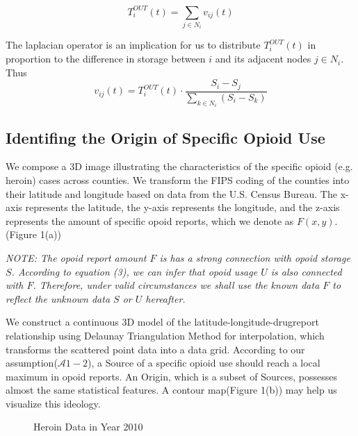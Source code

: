 \begin{equation}
T^{OUT}_i(t) = \sum_{j\in N_i}v_{ij}(t)
\end{equation}

The laplacian operator is an implication for us to distribute $T^{OUT}_i(t)$ in proportion to the difference in storage between $i$ and its adjacent nodes $j \in N_i$. Thus
\begin{equation}
v_{ij}(t) = T^{OUT}_i(t)\cdot \frac{S_i - S_j}{\sum_{k \in N_i}(S_i - S_k)}
\end{equation}



\subsection{Identifing the Origin of Specific Opioid Use}
We compose a 3D image illustrating the characteristics of the specific opioid (e.g. heroin) cases across counties. We transform the FIPS coding of the counties into their latitude and longitude based on data from the U.S. Census Bureau\cite{14}. The x-axis represents the latitude, the y-axis represents the longitude, and the z-axis represents the amount of specific opoid reports, which we denote as $F(x,y)$.(Figure 1(a))

\textit{NOTE: The opoid report amount $F$ is has a strong connection with opoid storage $S$. According to equation (3), we can infer that opoid usage $U$ is also connected with $F$. Therefore, under valid circumstances we shall use the known data $F$ to reflect the unknown data $S$ or $U$ hereafter.}

We construct a continuous 3D model of the latitude-longitude-drugreport relationship using Delaunay Triangulation Method for interpolation, which transforms the scattered point data into a data grid. According to our assumption($\mathcal{A}1-2$), a Source of a specific opioid use should reach a local maximum in opoid reports. An Origin, which is a subset of Sources, possesses almost the same statistical features. A contour map(Figure 1(b)) may help us visualize this ideology.

\begin{figure}[H]
	\centering
	\caption{Heroin Data in Year 2010}
\end{figure}

